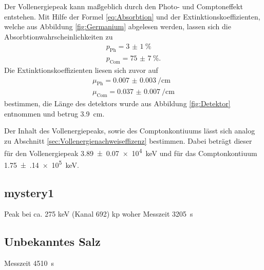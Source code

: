 Der Vollenergiepeak kann maßgeblich durch den Photo- und Comptoneffekt entstehen. Mit Hilfe der Formel \ref{eq:Absorbtion} und 
der Extinktionskoeffizienten, welche aus Abbildung \ref{fig:Germanium} abgelesen werden, lassen sich die Absorbtionwahrscheinlichkeiten
zu
\begin{align}
  p_\text{Ph} = \SI{3(1)}{\percent} \\
  p_\text{Com} = \SI{75(7)}{\percent}.
\end{align}
Die Extinktionskoeffizienten liesen sich zuvor auf 
\begin{gather}
  \mu_\text{Ph} = \SI{0.007(3)}{\per\centi\meter} \\
  \mu_\text{Com} = \SI{0.037(7)}{\per\centi\meter}
\end{gather}
bestimmen, die Länge des detektors wurde aus Abbildung \ref{fig:Detektor} entnommen und betrug \SI{3.9}{\centi\meter}.

Der Inhalt des Vollenergiepeaks, sowie des Comptonkontiuums lässt sich analog zu Abschnitt \ref{sec:Vollenergienachweiseffizenz}
bestimmen. Dabei beträgt dieser für den Vollenergiepeak \SI{3.89(7)e4}{\kilo\electronvolt} und für das Comptonkontiuum 
\SI{1.75(14)e5}{\kilo\electronvolt}.


\subsection{mystery1}
\label{sec:}
Peak bei ca. 275 keV (Kanal 692) kp woher
Messzeit \SI{3205}{\second}

\subsection{Unbekanntes Salz}
\label{sec:Salz}
Messzeit \SI{4510}{\second}


